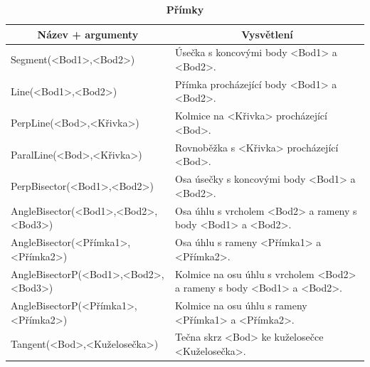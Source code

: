 \documentclass[11pt]{article}
\begin{document}
    \begin{table}[!htb]
    \begin{center}
        \caption{\bf Přímky}
        \begin{tabularx}{\linewidth}{|l|X|}
            \hline 
            \multicolumn{1}{|c|}{\textbf{Název + argumenty}} & \multicolumn{1}{c|}{\textbf{Vysvětlení}}\\
            \hline

            Segment(<Bod1>,<Bod2>) & Úsečka s koncovými body <Bod1> a <Bod2>. \\
            \hline
            Line(<Bod1>,<Bod2>) & Přímka procházející body <Bod1> a <Bod2>. \\
            \hline
            PerpLine(<Bod>,<Křivka>) & Kolmice na <Křivka> procházející <Bod>. \\
            \hline
            ParalLine(<Bod>,<Křivka>) & Rovnoběžka s <Křivka> procházející <Bod>. \\
            \hline
            PerpBisector(<Bod1>,<Bod2>) & Osa úsečky s koncovými body <Bod1> a <Bod2>. \\
            \hline
            AngleBisector(<Bod1>,<Bod2>,<Bod3>) & Osa úhlu s vrcholem <Bod2> a rameny s body <Bod1> a <Bod2>. \\
            \hline
            AngleBisector(<Přímka1>,<Přímka2>) & Osa úhlu s rameny <Přímka1> a <Přímka2>. \\
            \hline
            AngleBisectorP(<Bod1>,<Bod2>,<Bod3>) & Kolmice na osu úhlu s vrcholem <Bod2> a rameny s body <Bod1> a <Bod2>. \\
            \hline
            AngleBisectorP(<Přímka1>,<Přímka2>) & Kolmice na osu úhlu s rameny <Přímka1> a <Přímka2>. \\
            \hline
            Tangent(<Bod>,<Kuželosečka>) & Tečna skrz <Bod> ke kuželosečce <Kuželosečka>. \\
            \hline
        \end{tabularx}
    \end{center}
    \end{table}
\end{document}

